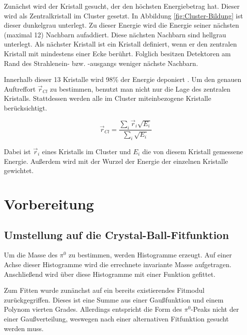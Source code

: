 \documentclass[a4paper,11pt,oneside,final,german,openbib,pdftex]{scrbook}
\begin{document}
{Zun\"achst wird der Kristall gesucht, der den h\"ochsten Energiebetrag hat. Dieser wird als Zentralkristall im Cluster gesetzt. In Abbildung \ref{fig:Cluster-Bildung} ist dieser dunkelgrau unterlegt. Zu dieser Energie wird die Energie seiner n\"achsten (maximal 12) Nachbarn aufaddiert. Diese n\"achsten Nachbarn sind hellgrau unterlegt. Als n\"achster Kristall ist ein Kristall definiert, wenn er den zentralen Kristall mit mindestens einer Ecke ber\"uhrt. Folglich besitzen Detektoren am Rand des Strahlenein- bzw. -ausgangs weniger n\"achste Nachbarn. 

Innerhalb dieser 13 Kristalle wird 98\% der Energie deponiert \cite{Un08}. Um den genauen Auftreffort $\overrightarrow{r}_{Cl}$ zu bestimmen, benutzt man nicht nur die Lage des zentralen Kristalls. Stattdessen werden alle im Cluster miteinbezogene Kristalle ber\"ucksichtigt.

\begin{equation}
	\overrightarrow{r}_{Cl}=\frac{\sum_{i}^{}\overrightarrow{r}_i\sqrt{E_i}}{\sum_{i}^{}\sqrt{E_i}}
\end{equation}
 
Dabei ist $\overrightarrow{r}_i$ eines Kristalls im Cluster und $E_i$ die von diesem Kristall gemessene Energie. Au{\ss}erdem wird mit der Wurzel der Energie der einzelnen Kristalle gewichtet.









\chapter{Vorbereitung}

\section{Umstellung auf die Crystal-Ball-Fitfunktion}
\label{sec:CB-Funktion}

Um die Masse des $\pi^0$ zu bestimmen, werden Histogramme erzeugt. Auf einer Achse dieser Histogramme wird die errechnete invariante Masse aufgetragen. Anschlie{\ss}end wird \"uber diese Histogramme mit einer Funktion gefittet.

Zum Fitten wurde zun\"anchst auf ein bereits existierendes Fitmodul zur\"uckgegriffen. Dieses ist eine Summe aus einer Gau{\ss}funktion und einem Polynom vierten Grades. Allerdings entspricht die Form des $\pi^0$-Peaks nicht der einer Gau{\ss}verteilung, weswegen nach einer alternativen Fitfunktion gesucht werden muss. 

}
\end{document}
